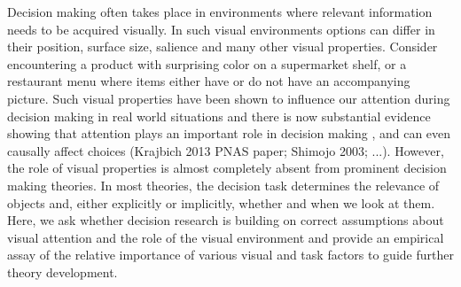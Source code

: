\documentclass{article}
\begin{document}

Decision making often takes place in environments where relevant information needs to be acquired visually. In such visual environments options can differ in their position, surface size, salience and many other visual properties. Consider encountering a product with surprising color on a  supermarket shelf, or a restaurant menu where items either have or do not have an accompanying picture. Such visual properties have been shown to influence our attention during decision making in real world situations and there is now substantial evidence showing that attention plays an important role in decision making \cite{gidloef2017a}, and can even causally affect choices (Krajbich 2013 PNAS paper; Shimojo 2003; ...). However, the role of visual properties is almost completely absent from prominent decision making theories. In most theories, the decision task determines the relevance of objects and, either explicitly or implicitly, whether and when we look at them. Here, we ask whether decision research is building on correct assumptions about visual attention and the role of the visual environment and provide an empirical assay of the relative importance of various visual and task factors to guide further theory development.


\end{document}
